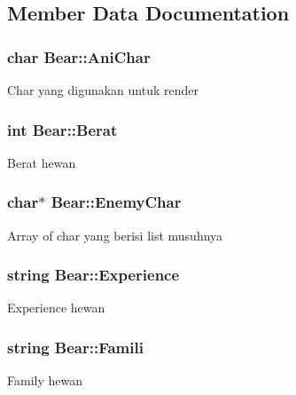 \subsection{Member Data Documentation}
\subsubsection[{\texorpdfstring{Ani\+Char}{AniChar}}]{\setlength{\rightskip}{0pt plus 5cm}char Bear\+::\+Ani\+Char\hspace{0.3cm}{\ttfamily [protected]}}\hypertarget{class_bear_a9745d3b799240db3554f6da9708d5cdd}{}\label{class_bear_a9745d3b799240db3554f6da9708d5cdd}
Char yang digunakan untuk render 
\subsubsection[{\texorpdfstring{Berat}{Berat}}]{\setlength{\rightskip}{0pt plus 5cm}int Bear\+::\+Berat\hspace{0.3cm}{\ttfamily [protected]}}\hypertarget{class_bear_ae3d0faff07047afc333f43cdd4633afd}{}\label{class_bear_ae3d0faff07047afc333f43cdd4633afd}
Berat hewan 
\subsubsection[{\texorpdfstring{Enemy\+Char}{EnemyChar}}]{\setlength{\rightskip}{0pt plus 5cm}char$\ast$ Bear\+::\+Enemy\+Char\hspace{0.3cm}{\ttfamily [protected]}}\hypertarget{class_bear_a035b584369de54e3d25d7e19aa99ee6d}{}\label{class_bear_a035b584369de54e3d25d7e19aa99ee6d}
Array of char yang berisi list musuhnya 
\subsubsection[{\texorpdfstring{Experience}{Experience}}]{\setlength{\rightskip}{0pt plus 5cm}string Bear\+::\+Experience\hspace{0.3cm}{\ttfamily [protected]}}\hypertarget{class_bear_af37839ada6bce88bfa2eecc5594a14f3}{}\label{class_bear_af37839ada6bce88bfa2eecc5594a14f3}
Experience hewan 
\subsubsection[{\texorpdfstring{Famili}{Famili}}]{\setlength{\rightskip}{0pt plus 5cm}string Bear\+::\+Famili\hspace{0.3cm}{\ttfamily [protected]}}\hypertarget{class_bear_a767087abd9a85df8d7d491468a38c31c}{}\label{class_bear_a767087abd9a85df8d7d491468a38c31c}
Family hewan 
